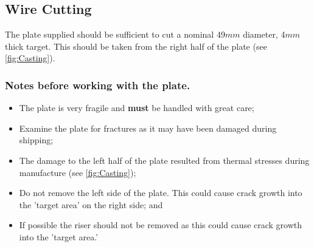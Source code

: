 \subsection{Wire Cutting}
The plate supplied should be sufficient to cut a nominal 49$mm$ diameter, 4$mm$ thick target. This should be taken from the right half of the plate (see \ref{fig:Casting}). 

\subsubsection{Notes before working with the plate.}
\begin{itemize}
\item The plate is very fragile and \textbf{must} be handled with great care; 
\item Examine the plate for fractures as it may have been damaged during shipping; 
\item The damage to the left half of the plate resulted from thermal stresses during manufacture (see \ref{fig:Casting});
\item Do not remove the left side of the plate. This could cause crack growth into the 'target area' on the right side; and
\item If possible the riser should not be removed as this could cause crack growth into the 'target area.'
\end{itemize}
